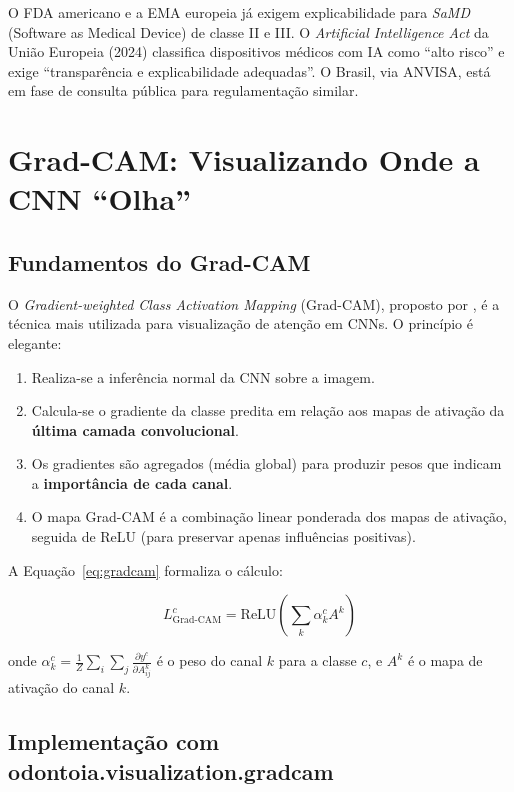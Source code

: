 O FDA americano e a EMA europeia já exigem explicabilidade para
\textit{SaMD} (Software as Medical Device) de classe II e III. O
\textit{Artificial Intelligence Act} da União Europeia (2024) classifica
dispositivos médicos com IA como ``alto risco'' e exige ``transparência
e explicabilidade adequadas''. O Brasil, via ANVISA, está em fase de
consulta pública para regulamentação similar.

\section{Grad-CAM: Visualizando Onde a CNN ``Olha''}

\subsection{Fundamentos do Grad-CAM}

O \textit{Gradient-weighted Class Activation Mapping} (Grad-CAM),
proposto por , é a técnica mais utilizada
para visualização de atenção em CNNs. O princípio é elegante:

\begin{enumerate}
  \item Realiza-se a inferência normal da CNN sobre a imagem.
  \item Calcula-se o gradiente da classe predita em relação aos mapas
    de ativação da \textbf{última camada convolucional}.
  \item Os gradientes são agregados (média global) para produzir pesos
    que indicam a \textbf{importância de cada canal}.
  \item O mapa Grad-CAM é a combinação linear ponderada dos mapas de
    ativação, seguida de ReLU (para preservar apenas influências positivas).
\end{enumerate}

A Equação~\ref{eq:gradcam} formaliza o cálculo:

\begin{equation}
  L_{\text{Grad-CAM}}^{c} = \text{ReLU}\left(\sum_{k} \alpha_{k}^{c} A^{k}\right)
  \label{eq:gradcam}
\end{equation}

onde $\alpha_{k}^{c} = \frac{1}{Z} \sum_{i} \sum_{j} \frac{\partial y^{c}}{\partial A_{ij}^{k}}$
é o peso do canal $k$ para a classe $c$, e $A^{k}$ é o mapa de ativação
do canal $k$.

\subsection{Implementação com odontoia.visualization.gradcam}

